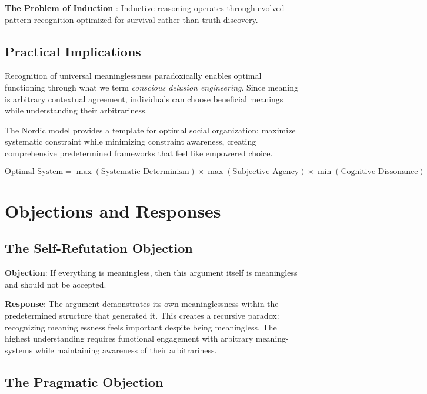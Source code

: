 \documentclass[12pt,a4paper]{article}
\begin{document}
\textbf{The Problem of Induction} \citep{hume1748enquiry}: Inductive reasoning operates through evolved pattern-recognition optimized for survival rather than truth-discovery.

\subsection{Practical Implications}

Recognition of universal meaninglessness paradoxically enables optimal functioning through what we term \textit{conscious delusion engineering}. Since meaning is arbitrary contextual agreement, individuals can choose beneficial meanings while understanding their arbitrariness.

The Nordic model provides a template for optimal social organization: maximize systematic constraint while minimizing constraint awareness, creating comprehensive predetermined frameworks that feel like empowered choice.

\begin{equation}
\text{Optimal System} = \max(\text{Systematic Determinism}) \times \max(\text{Subjective Agency}) \times \min(\text{Cognitive Dissonance})
\end{equation}

\section{Objections and Responses}

\subsection{The Self-Refutation Objection}

\textbf{Objection}: If everything is meaningless, then this argument itself is meaningless and should not be accepted.

\textbf{Response}: The argument demonstrates its own meaninglessness within the predetermined structure that generated it. This creates a recursive paradox: recognizing meaninglessness feels important despite being meaningless. The highest understanding requires functional engagement with arbitrary meaning-systems while maintaining awareness of their arbitrariness.

\subsection{The Pragmatic Objection}
\end{document}
